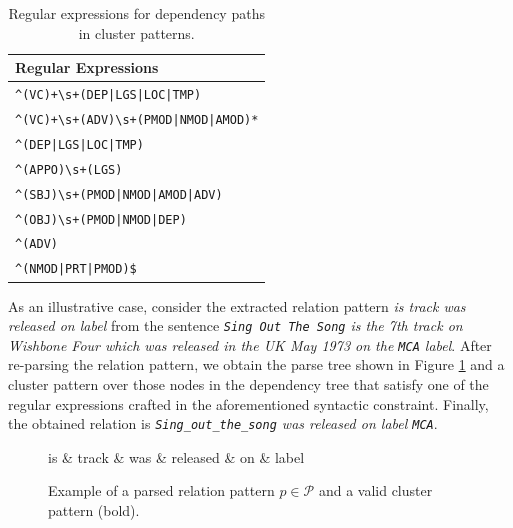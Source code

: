 \begin{table}[]
\scriptsize
\centering
    \begin{tabular}{ l}
    \hline
    Regular Expressions \\
    \hline
    \verb/^(VC)+\s+(DEP|LGS|LOC|TMP)/ \\
    \verb/^(VC)+\s+(ADV)\s+(PMOD|NMOD|AMOD)*/ \\
    \verb/^(DEP|LGS|LOC|TMP)/ \\
    \verb/^(APPO)\s+(LGS)/ \\
    \verb/^(SBJ)\s+(PMOD|NMOD|AMOD|ADV)/ \\
    \verb/^(OBJ)\s+(PMOD|NMOD|DEP)/ \\
    \verb/^(ADV)/ \\
    \verb/^(NMOD|PRT|PMOD)$/ \\
    \hline
    \end{tabular}
    \caption{Regular expressions for dependency paths in cluster patterns.}
    \label{tbl:kb:expressions}
\end{table}

As an illustrative case, consider the extracted relation pattern \textit{is track was released on label} from the sentence \textit{\texttt{Sing Out The Song} is the 7th track on Wishbone Four which was released in the UK May 1973 on the \texttt{MCA} label}. After re-parsing the relation pattern, we obtain the parse tree shown in Figure \ref{fig:kb:parsedpattern} and a cluster pattern over those nodes in the dependency tree that satisfy one of the regular expressions crafted in the aforementioned syntactic constraint. Finally, the obtained relation is \textit{\texttt{Sing\_out\_the\_song} was released on label \texttt{MCA}}.

\begin{figure}[!htb]
\centering
\begin{dependency}
\begin{deptext}[column sep=.5cm]
is \& track \& was \& released \& on \& label \\
\end{deptext}




\end{dependency}
\vspace*{-5mm}
\caption{Example of a parsed relation pattern $p \in \mathcal{P}$ and a valid cluster pattern (bold).}
\label{fig:kb:parsedpattern}
\end{figure}


